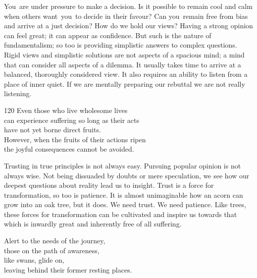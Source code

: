 \begin{dhpRefl}

You are under pressure to make a decision. Is it possible to remain
cool and calm when others want you to decide in their favour? Can
you remain free from bias and arrive at a just decision? How do we
hold our views? Having a strong opinion can feel great; it can appear
as confidence. But such is the nature of fundamentalism; so too is
providing simplistic answers to complex questions. Rigid views and
simplistic solutions are not aspects of a spacious mind; a mind that
can consider all aspects of a dilemma. It usually takes time to
arrive at a balanced, thoroughly considered view. It also requires an
ability to listen from a place of inner quiet. If we are mentally
preparing our rebuttal we are not really listening.

\end{dhpRefl}


\begin{dhpVerse}{120}
\label{dhp-120}
Even those who live wholesome lives\\
can experience suffering so long as their acts\\
have not yet borne direct fruits.\\
However, when the fruits of their actions ripen\\
the joyful consequences cannot be avoided.
\end{dhpVerse}

\begin{dhpRefl}

Trusting in true principles is not always easy. Pursuing popular
opinion is not always wise. Not being dissuaded by doubts or mere
speculation, we see how our deepest questions about reality lead us
to insight. Trust is a force for transformation, so too is patience.
It is almost unimaginable how an acorn can grow into an oak tree, but
it does. We need trust. We need patience. Like trees, these forces
for transformation can be cultivated and inspire us towards that
which is inwardly great and inherently free of all suffering.

\end{dhpRefl}


\begin{dhpVerse}{91}
\label{dhp-91}
Alert to the needs of the journey,\\
those on the path of awareness,\\
like swans, glide on,\\
leaving behind their former resting places.
\end{dhpVerse}


